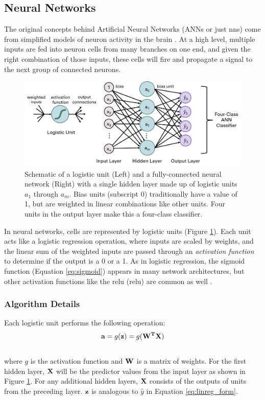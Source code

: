 \subsection{Neural Networks}\label{ch3:ann}
The original concepts behind Artificial Neural Networks (ANNs or just \acrshort{nn}s) come from simplified models of neuron activity in the brain \citep[p.\ 394]{hastie_elements_2009}. At a high level, multiple inputs are fed into neuron cells from many branches on one end, and given the right combination of those inputs, these cells will fire and propagate a signal to the next group of connected neurons.
\begin{figure}[H]
\centering
\includegraphics[width=\textwidth]{templates/images/Figure-ANN_schematic.png}
\caption[Neural network schematic]{Schematic of a logistic unit (Left) and a fully-connected neural network (Right) with a single hidden layer made up of logistic units $a_1$ through $a_m$. Bias units (subscript 0) traditionally have a value of 1, but are weighted in linear combinations like other units. Four units in the output layer make this a four-class classifier.}
\label{fig:nn_schematic}
\end{figure}

In neural networks, cells are represented by logistic units (Figure \ref{fig:nn_schematic}). Each unit acts like a logistic regression operation, where inputs are scaled by weights, and the linear sum of the weighted inputs are passed through an \textit{activation function} to determine if the output is a 0 or a 1. As in logistic regression, the sigmoid function (Equation \ref{eq:sigmoid}) appears in many network architectures, but other activation functions like the \acrlong{relu} (\acrshort{relu}) are common as well \citep{brownlee_gentle_2019}.

\subsubsection{Algorithm Details} \label{ch3:ann_details}
Each logistic unit performs the following operation:
\\
\begin{equation}
\label{eq:nn_activation}
    {\bf{a}} = g({\bf{z}}) = g({\bf{W^TX}})
\end{equation}
\\
where $g$ is the activation function and $\bf{W}$ is a matrix of weights. For the first hidden layer, $\bf{X}$ will be the predictor values from the input layer as shown in Figure \ref{fig:nn_schematic}. For any additional hidden layers, $\bf{X}$ consists of the outputs of units from the preceding layer. $\bf{z}$ is analogous to \(\hat{y}\) in Equation \ref{eq:linreg_form}.

